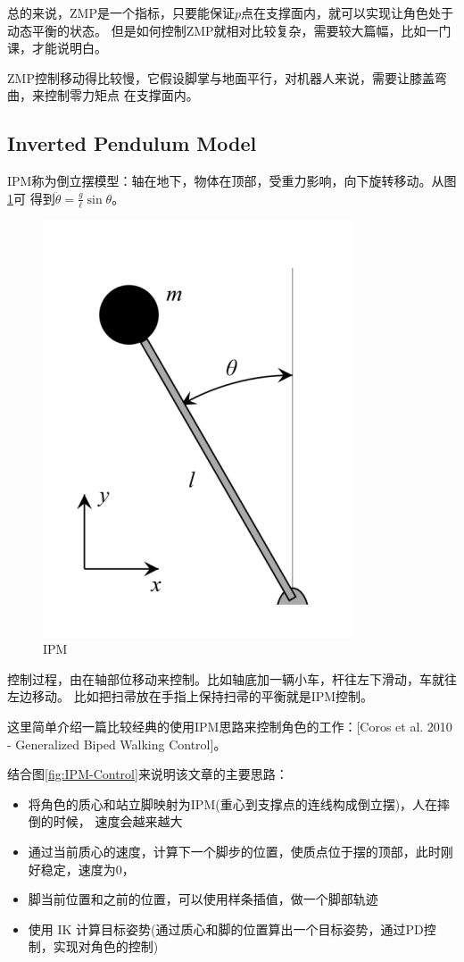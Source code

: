 \documentclass[lang=cn,newtx,10pt,scheme=chinese]{elegantbook}
\begin{document}
总的来说，ZMP是一个指标，只要能保证$p$点在支撑面内，就可以实现让角色处于动态平衡的状态。
但是如何控制ZMP就相对比较复杂，需要较大篇幅，比如一门课，才能说明白。

ZMP控制移动得比较慢，它假设脚掌与地面平行，对机器人来说，需要让膝盖弯曲，来控制零力矩点
在支撑面内。
\subsection{Inverted Pendulum Model}
IPM称为倒立摆模型：轴在地下，物体在顶部，受重力影响，向下旋转移动。从图\ref{fig:IPM}可
得到$\ddot{\theta}=\frac{g}{\ell} \sin \theta$。
\begin{figure}[htbp]
  \centering
  \includegraphics[totalheight=1.6in]{"./image/IPM.png"}
  \caption{IPM} \label{fig:IPM}
\end{figure}
控制过程，由在轴部位移动来控制。比如轴底加一辆小车，杆往左下滑动，车就往左边移动。
比如把扫帚放在手指上保持扫帚的平衡就是IPM控制。

这里简单介绍一篇比较经典的使用IPM思路来控制角色的工作：[Coros et al. 2010 - Generalized Biped Walking Control]。

结合图\ref{fig:IPM-Control}来说明该文章的主要思路：
\begin{itemize}[itemindent=2em]
  \item 将角色的质心和站立脚映射为IPM(重心到支撑点的连线构成倒立摆)，人在摔倒的时候，
  速度会越来越大
  \item 通过当前质心的速度，计算下一个脚步的位置，使质点位于摆的顶部，此时刚好稳定，速度为$0$，
  \item 脚当前位置和之前的位置，可以使用样条插值，做一个脚部轨迹
  \item 使用 IK 计算目标姿势(通过质心和脚的位置算出一个目标姿势，通过PD控制，实现对角色的控制)
\end{itemize}
\end{document}
